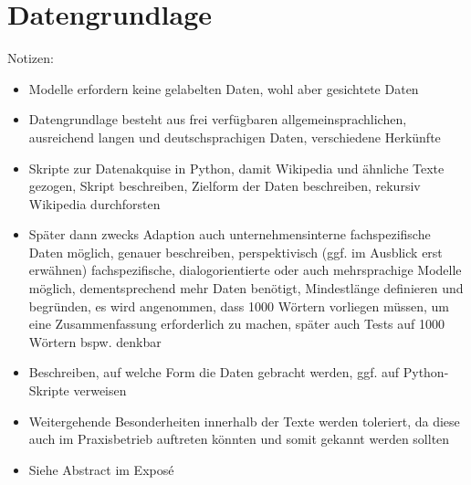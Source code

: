 \chapter{Datengrundlage}
\thispagestyle{fancy}
\label{chap:Datengrundlage}

Notizen:
\begin{itemize}
	\item Modelle erfordern keine gelabelten Daten, wohl aber gesichtete Daten
	\item Datengrundlage besteht aus frei verfügbaren allgemeinsprachlichen, ausreichend langen und deutschsprachigen Daten, verschiedene Herkünfte
	\item Skripte zur Datenakquise in Python, damit Wikipedia und ähnliche Texte gezogen, Skript beschreiben, Zielform der Daten beschreiben, rekursiv Wikipedia durchforsten
	\item Später dann zwecks Adaption auch unternehmensinterne fachspezifische Daten möglich, genauer beschreiben, perspektivisch (ggf. im Ausblick erst erwähnen) fachspezifische, dialogorientierte oder auch mehrsprachige Modelle möglich, dementsprechend mehr Daten benötigt, Mindestlänge definieren und begründen, es wird angenommen, dass 1000 Wörtern vorliegen müssen, um eine Zusammenfassung erforderlich zu machen, später auch Tests auf 1000 Wörtern bspw. denkbar
	\item Beschreiben, auf welche Form die Daten gebracht werden, ggf. auf Python-Skripte verweisen
	\item Weitergehende Besonderheiten innerhalb der Texte werden toleriert, da diese auch im Praxisbetrieb auftreten könnten und somit gekannt werden sollten
	\item Siehe Abstract im Exposé
\end{itemize}
